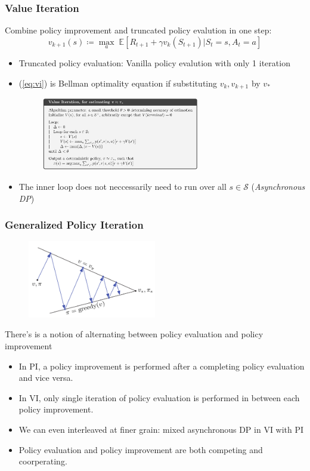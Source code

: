 \documentclass[10pt]{beamer}
\theoremstyle{remark}
\begin{document}
\begin{frame}
    \frametitle{Value Iteration}
    Combine policy improvement and truncated policy evalution in one step:
    \begin{equation}
        v_{k+1}(s) \coloneqq \max_{a} \; \mathbb{E} [R_{t+1} + \gamma v_{k}(S_{t+1}) | S_t = s, A_t = a]
        \label{eq:vi}
    \end{equation} 
    \begin{itemize}
        \item Truncated policy evaluation: Vanilla policy evalution with only 1 iteration
        \item (\ref{eq:vi}) is Bellman optimality equation if substituting $v_k, v_{k+1}$ by $v_\ast$
    \begin{figure}
        \centering
        \includegraphics[width=0.65\textwidth]{figures/value_iteration.png}
    \end{figure}
\item The inner loop does not neccessarily need to run over all $s \in \mathcal{S}$ (\textit{Asynchronous DP})
    \end{itemize}
\end{frame}




\begin{frame}
    \frametitle{Generalized Policy Iteration}
    \begin{figure}
        \centering
        \includegraphics[width=0.5\textwidth]{figures/generalized_PI.png}
    \end{figure}
    There's is a notion of alternating between policy evaluation and policy improvement
    \begin{itemize}
        \item In PI, a policy improvement is performed after a completing policy evaluation and vice versa.
        \item In VI, only single iteration of policy evaluation is performed in between each policy improvement.
        \item We can even interleaved at finer grain: mixed asynchronous DP in VI with PI
        \item Policy evaluation and policy improvement are both competing and coorperating.
    \end{itemize}
\end{frame}
\end{document}
